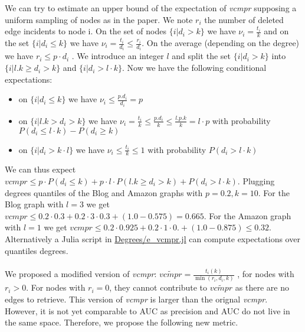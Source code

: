 \documentclass{article}
\begin{document}
We can try to estimate an upper bound of the expectation of \textit{vcmpr} supposing a uniform sampling of nodes as in the paper.
We note $r_{i}$ the number of deleted edge incidents to node i.
On the set of nodes $\{i | d_{i} > k\}$ we have $ \nu_{i} = \frac{t_{i}}{k} $ and on the set $\{i | d_{i} \leq k\}$  we have  $ \nu_{i} = \frac{t_{i}}{d_{i}} \leq \frac{r_{i}}{d_{i}}$.
On the average (depending on the degree) we have $ r_{i} \leq p \cdot d_{i} $ . We introduce an integer $l$ and split the set $ \{ i | d_{i} > k  \}$ into  $ \{ i | l . k \ge d_{i} > k  \}$ and $ \{ i |  d_{i} > l \cdot k \}$. Now we have the following conditional expectations:
\begin{itemize}
    \item  on $\{i | d_{i} \leq k\}$ we have $ \nu_{i} \leq \frac{p . d_{i}}{d_{i}} = p$
    \item on  $ \{ i | l . k > d_{i} > k  \}$ we have $ \nu_{i} = \frac{t_{i}}{k} \leq \frac{p.d_{i}}{k} \leq \frac{l.p.k}{k} = l \cdot p $ with probability $P(d_{i} \leq l \cdot k) - P(d_{i} \geq k)$
    \item on $\{i| d_{i} > k \cdot l \}$  we have $ \nu_{i} \leq \frac{t_{i}}{k} \leq 1 $ with probability $ P(d_{i} > l \cdot k) $
\end{itemize}

We can thus expect $ vcmpr \leq p \cdot P(d_{i} \leq k) + p \cdot l \cdot P(l . k \geq d_{i} > k ) + P(d_{i} > l \cdot k)$.
Plugging degrees quantiles of the Blog and Amazon graphs
with $p=0.2, k=10$. For the Blog graph with $l=3$ we get $vcmpr \leq  0.2 \cdot 0.3 + 0.2 \cdot 3 \cdot 0.3 + (1.0-0.575) = 0.665$.
For the Amazon graph with $l = 1$ we get $ vcmpr \leq 0.2 \cdot 0.925 + 0.2 \cdot 1 \cdot 0. + (1.0-0.875) \leq 0.32$.
Alternatively a Julia script in \href{https://github.com/jean-pierreBoth/linkauc/tree/master/Degrees}{\color{blue}Degrees/e\_vcmpr.jl} can compute expectations over quantiles degrees.

\paragraph{}

We proposed a modified version of \textit{vcmpr}: $ \widetilde{vcmpr} = \frac{t_{i}(k)}{\min(r_{i}, d_{i}, k)}$ , for nodes with $ r_{i} > 0 $. For nodes with $ r_{i} = 0 $, they cannot contribute to $\widetilde{vcmpr}$  as there are no edges to retrieve.
This version of \textit{vcmpr} is larger than the orignal \textit{vcmpr}. However, it is not yet comparable to AUC as precision and AUC do not live in the same space. Therefore, we propose the following new metric.
\end{document}
